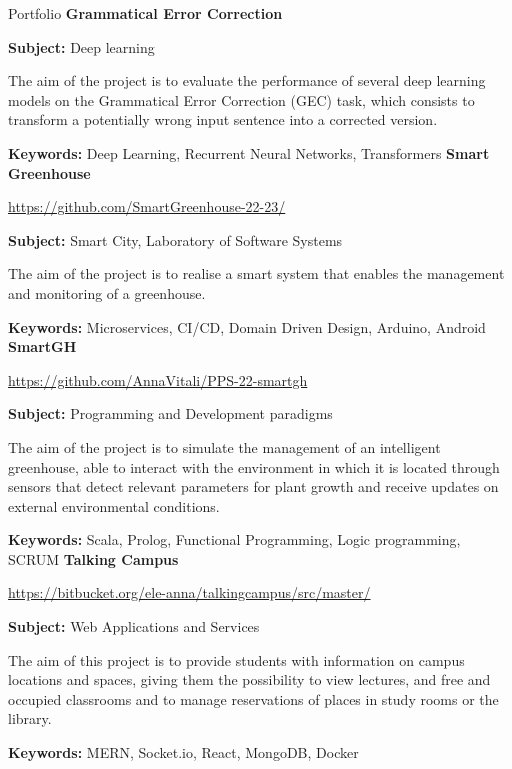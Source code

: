 \begin{rubric}{Portfolio}
\entry*[05/2023 - 06/2023] \textbf{Grammatical Error Correction}
        \par \textbf{Subject:} Deep learning
        \par The aim of the project is to evaluate the performance of several deep learning models on the Grammatical Error Correction (GEC) task, which consists to transform a potentially wrong input sentence into a corrected version.
        \par \textbf{Keywords:} Deep Learning, Recurrent Neural Networks, Transformers
%
\entry*[11/2022 - 03/2023] \textbf{Smart Greenhouse}
        \par \faGithub \url{https://github.com/SmartGreenhouse-22-23/}
        \par \textbf{Subject:} Smart City, Laboratory of Software Systems
        \par The aim of the project is to realise a smart system that enables the management and monitoring of a greenhouse.
        \par \textbf{Keywords:} Microservices, CI/CD, Domain Driven Design, Arduino, Android
%
\entry*[07/2022 - 10/2022] \textbf{SmartGH}
        \par \faGithub \url{https://github.com/AnnaVitali/PPS-22-smartgh}
        \par \textbf{Subject:} Programming and Development paradigms
        \par The aim of the project is to simulate the management of an intelligent greenhouse, able to interact with the environment in which it is located through sensors that detect relevant parameters for plant growth and receive updates on external environmental conditions.
        \par \textbf{Keywords:} Scala, Prolog, Functional Programming, Logic programming, SCRUM
%
\entry*[04/2022 - 06/2022] \textbf{Talking Campus}
        \par \faGithub \url{https://bitbucket.org/ele-anna/talkingcampus/src/master/}
        \par \textbf{Subject:} Web Applications and Services
        \par The aim of this project is to provide students with information on campus locations and spaces, giving them the possibility to view lectures, and free and occupied classrooms and to manage reservations of places in study rooms or the library. 
        \par \textbf{Keywords:} MERN, Socket.io, React, MongoDB, Docker

\end{rubric}